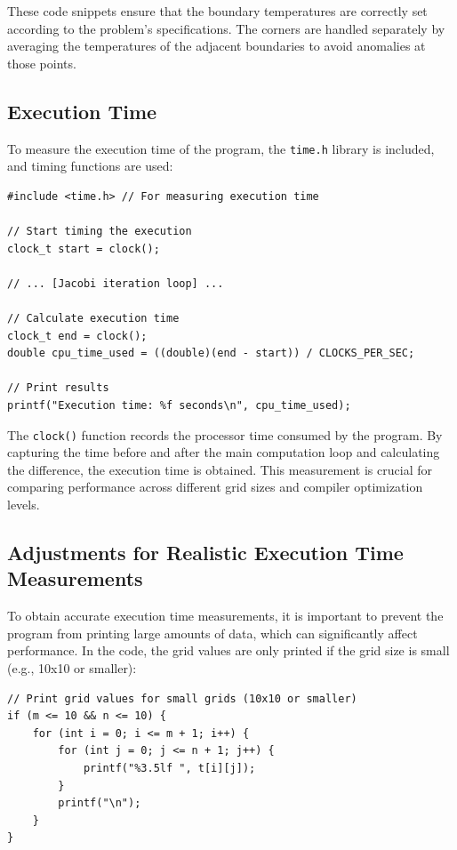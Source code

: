 \documentclass{article}
\begin{document}
These code snippets ensure that the boundary temperatures are correctly set according to the problem's specifications. The corners are handled separately by averaging the temperatures of the adjacent boundaries to avoid anomalies at those points.

\subsection{Execution Time}

To measure the execution time of the program, the \texttt{time.h} library is included, and timing functions are used:

\begin{lstlisting}[style=CStyle, caption={Execution Time Measurement}]
#include <time.h> // For measuring execution time

// Start timing the execution
clock_t start = clock();

// ... [Jacobi iteration loop] ...

// Calculate execution time
clock_t end = clock();
double cpu_time_used = ((double)(end - start)) / CLOCKS_PER_SEC;

// Print results
printf("Execution time: %f seconds\n", cpu_time_used);
\end{lstlisting}

The \texttt{clock()} function records the processor time consumed by the program. By capturing the time before and after the main computation loop and calculating the difference, the execution time is obtained. This measurement is crucial for comparing performance across different grid sizes and compiler optimization levels.

\subsection{Adjustments for Realistic Execution Time Measurements}

To obtain accurate execution time measurements, it is important to prevent the program from printing large amounts of data, which can significantly affect performance. In the code, the grid values are only printed if the grid size is small (e.g., 10x10 or smaller):

\begin{lstlisting}[style=CStyle, caption={Printing Grid Values for Small Grids}]
// Print grid values for small grids (10x10 or smaller)
if (m <= 10 && n <= 10) {
    for (int i = 0; i <= m + 1; i++) {
        for (int j = 0; j <= n + 1; j++) {
            printf("%3.5lf ", t[i][j]);
        }
        printf("\n");
    }
}
\end{lstlisting}
\end{document}

